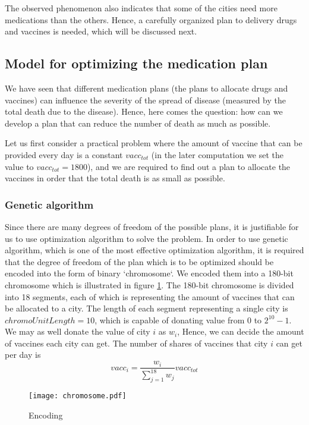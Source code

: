 The observed phenomenon also indicates that some of the cities need more medications than the others. Hence, a carefully organized plan to delivery drugs and vaccines is needed, which will be discussed next.

\subsection{Model for optimizing the medication plan}
We have seen that different medication plans (the plans to allocate drugs and vaccines) can influence the severity of the spread of disease (measured by the total death due to the disease). Hence, here comes the question: how can we develop a plan that can reduce the number of death as much as possible.

Let us first consider a practical problem where the amount of vaccine that can be provided every day is a constant $vacc_{tot}$ (in the later computation we set the value to $vacc_{tot} = 1800$), and we are required to find out a plan to allocate the vaccines in order that the total death is as small as possible.
\subsubsection{Genetic algorithm}
Since there are many degrees of freedom of the possible plans, it is justifiable for us to use optimization algorithm to solve the problem. In order to use genetic algorithm, which is one of the most effective optimization algorithm, it is required that the degree of freedom of the plan which is to be optimized should be encoded into the form of binary `chromosome`. We encoded them into a 180-bit chromosome which is illustrated in figure \ref{chromosome}. The 180-bit chromosome is divided into 18 segments, each of which is representing the amount of vaccines that can be allocated to a city. The length of each segment representing a single city is $chromoUnitLength=10$, which is capable of donating value from 0 to $2^{10}-1$. We may as well donate the value of city $i$ as $w_i$, Hence, we can decide the amount of vaccines each city can get. The number of shares of vaccines that city $i$ can get per day is
\begin{equation}
	vacc_i = \dfrac{w_i}{\sum_{j=1}^{18} w_j} vacc_{tot}
\end{equation}

\begin{figure}
	\centering
	\texttt{[image: chromosome.pdf]}
	\caption{Encoding}
	\label{chromosome}
\end{figure}

